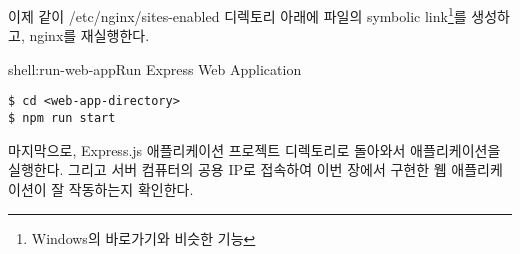 이제 \와 같이 /etc/nginx/sites-enabled 디렉토리 아래에  파일의 symbolic link\footnote{Windows의 바로가기와 비슷한 기능}를 생성하고, nginx를 재실행한다.

\begin{shellenv}{shell:run-web-app}{Run Express Web Application}\begin{verbatim}
$ cd <web-app-directory>
$ npm run start
\end{verbatim}
\end{shellenv}

마지막으로, Express.js 애플리케이션 프로젝트 디렉토리로 돌아와서 애플리케이션을 실행한다. 그리고 서버 컴퓨터의 공용 IP로 접속하여 이번 장에서 구현한 웹 애플리케이션이 잘 작동하는지 확인한다.
